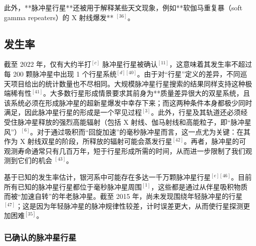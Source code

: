 此外，**脉冲星行星**还被用于解释某些天文现象，例如**软伽马重复暴（soft gamma repeaters）的 X 射线爆发** $^{[36]}$。
\subsection{发生率}
截至 2022 年，仅有大约半打$^{[c]}$ 脉冲星行星被确认$^{[11]}$，这意味着其发生率不超过每 200 颗脉冲星中出现 1 个行星系统$^{[d][40]}$。由于对“行星”定义的差异，不同巡天项目给出的统计数量也不尽相同。大规模脉冲星行星搜索的结果同样支持这种极端稀有性$^{[41]}$。大多数行星形成情景要求其前身为**质量差异很大的双星系统，且该系统必须在形成脉冲星的超新星爆发中幸存下来；而这两种条件本身都极少同时满足，因此脉冲星行星的形成是一个罕见过程$^{[3]}$。此外，行星及其轨道还必须经受住脉冲星释放的强烈高能辐射（包括 X 射线、伽马射线和高能粒子，即“脉冲星风”）$^{[6]}$。对于通过吸积而“回旋加速”的毫秒脉冲星而言，这一点尤为关键：在其作为 X 射线双星的阶段，所释放的辐射可能会蒸发行星$^{[42]}$。再者，脉冲星的可观测寿命通常只有几百万年，短于行星形成所需的时间，从而进一步限制了我们观测到它们的机会 $^{[43]}$。

基于已知的发生率估计，银河系中可能存在多达一千万颗脉冲星行星$^{[e][46]}$。目前所有已知的脉冲星行星都位于毫秒脉冲星周围$^{[1]}$，这些都是通过从伴星吸积物质而被“加速自转”的年老脉冲星。截至 2015 年，尚未发现围绕年轻脉冲星的行星$^{[47]}$；这是因为年轻脉冲星的脉冲规律性较差，计时误差更大，从而使行星探测更加困难$^{[35]}$。
\subsubsection{已确认的脉冲星行星}
